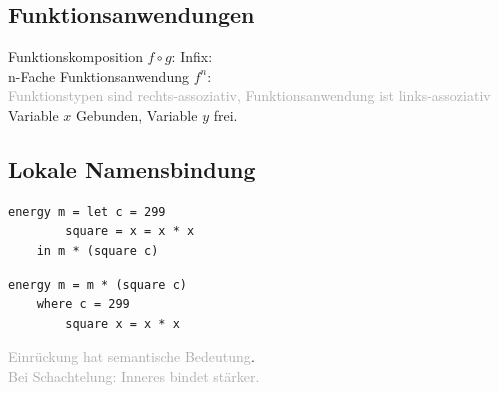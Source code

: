 \documentclass{Zusammenfassung}
\begin{document}
\subsection{Funktionsanwendungen}\label{subsec:funktionsanwendungen}
Funktionskomposition $f \circ g$:  Infix: \\
n-Fache Funktionsanwendung $f^n$: \\
\textcolor{darkgray}{Funktionstypen sind rechts-assoziativ, Funktionsanwendung ist links-assoziativ}\\
 Variable $x$ Gebunden, Variable $y$ frei.\\
\subsection{Lokale Namensbindung}\label{subsec:lokale-namensbindung}
\begin{multicols}{2}
    \begin{verbatim}
energy m = let c = 299
        square = x = x * x
    in m * (square c)
    \end{verbatim}
\columnbreak
    \begin{verbatim}
energy m = m * (square c)
    where c = 299
        square x = x * x
    \end{verbatim}
\end{multicols}
\textcolor{darkgray}{Einrückung hat semantische Bedeutung}.\\
\textcolor{darkgray}{Bei Schachtelung: Inneres  bindet stärker.}\\
\end{document}
